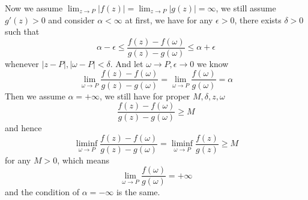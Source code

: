 \documentclass[lang=en,11pt,a4paper,citestyle =authoryear]{elegantpaper}
\begin{document}
Now we assume $\lim_{z\to P} |f(z)| = \lim_{z\to P} |g(z)| = \infty$, we still assume $g'(z)>0$ and consider $\alpha < \infty$ at first, we have for any $\epsilon > 0$, there exists $\delta >0$ such that
\[
\alpha-\epsilon \leq \dfrac{f(z)-f(\omega)}{g(z)-g(\omega)} \leq \alpha +\epsilon
\]
whenever $|z-P|,|\omega-P|<\delta$. And let $\omega\to P, \epsilon \to 0$ we know
\[
\lim_{\omega\to P}\dfrac{f(z)-f(\omega)}{g(z)-g(\omega)} = \lim_{\omega\to P}\dfrac{f(\omega)}{g(\omega)} = \alpha
\]
Then we assume $\alpha = +\infty$, we still have for proper $M,\delta,z,\omega$
\[
\dfrac{f(z)-f(\omega)}{g(z)-g(\omega)} \geq M
\]
and hence
\[\liminf_{\omega\to P} \dfrac{f(z)-f(\omega)}{g(z)-g(\omega)} = \liminf_{\omega\to P} \dfrac{f(z)}{g(z)} \geq M\]
for any $M>0$, which means
\[\lim_{\omega\to P}\dfrac{f(\omega)}{g(\omega)} = +\infty\] and the condition of $\alpha = -\infty$ is the same.
\vspace{0.5em}


\addappheadtotoc
\end{document}
